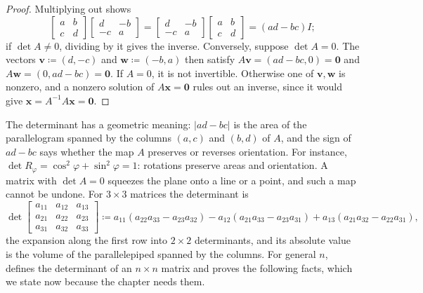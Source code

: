 \begin{proof}
Multiplying out shows
\[
\begin{bmatrix}a&b\\c&d\end{bmatrix}\begin{bmatrix}d&-b\\-c&a\end{bmatrix}=\begin{bmatrix}d&-b\\-c&a\end{bmatrix}\begin{bmatrix}a&b\\c&d\end{bmatrix}=(ad-bc)I;
\]
if $\det A\ne0$, dividing by it gives the inverse. Conversely, suppose $\det A=0$. The vectors $\mathbf v\coloneqq(d,-c)$ and $\mathbf w\coloneqq(-b,a)$ then satisfy $A\mathbf v=(ad-bc,0)=\mathbf 0$ and $A\mathbf w=(0,ad-bc)=\mathbf 0$. If $A=0$, it is not invertible. Otherwise one of $\mathbf v,\mathbf w$ is nonzero, and a nonzero solution of $A\mathbf x=\mathbf 0$ rules out an inverse, since it would give $\mathbf x=A^{-1}A\mathbf x=\mathbf 0$.
\end{proof}

The determinant has a geometric meaning: $|ad-bc|$ is the area of the parallelogram spanned by the columns $(a,c)$ and $(b,d)$ of $A$, and the sign of $ad-bc$ says whether the map $A$ preserves or reverses orientation. For instance, $\det R_\varphi=\cos^2\varphi+\sin^2\varphi=1$: rotations preserve areas and orientation. A matrix with $\det A=0$ squeezes the plane onto a line or a point, and such a map cannot be undone. For $3\times3$ matrices the determinant is
\[
\det\begin{bmatrix}a_{11}&a_{12}&a_{13}\\a_{21}&a_{22}&a_{23}\\a_{31}&a_{32}&a_{33}\end{bmatrix}\coloneqq a_{11}(a_{22}a_{33}-a_{23}a_{32})-a_{12}(a_{21}a_{33}-a_{23}a_{31})+a_{13}(a_{21}a_{32}-a_{22}a_{31}),
\]
the expansion along the first row into $2\times2$ determinants, and its absolute value is the volume of the parallelepiped spanned by the columns. For general $n$,  defines the determinant of an $n\times n$ matrix and proves the following facts, which we state now because the chapter needs them.

